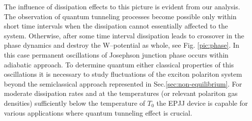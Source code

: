 \documentclass[aps, pre, preprint, groupedaddress, superscriptaddress, showkeys, showpacs] {revtex4-1}
\begin{document}
{The influence of dissipation effects to this picture is evident from our analysis. The observation of quantum tunneling processes become possible only within short time intervals when the dissipation cannot essentially affected to the system.
Otherwise, after some time interval dissipation leads to crossover in the phase dynamics and destroy the W--potential as whole, see Fig. \ref{pic:phase}. In this case permanent oscillations of Josephson junction phase occurs within adiabatic approach. To determine quantum either classical properties of this oscillations it is necessary to study fluctuations of the exciton polariton system beyond the semiclassical approach represented in Sec.\ref{sec:non-equilibrium}}. 
For moderate dissipation rates and at the temperatures (or relevant polariton gas densities) sufficiently below the temperature of $T_{0}$   the EPJJ device is  capable for various applications where quantum tunneling effect is crucial. 
\end{document}
